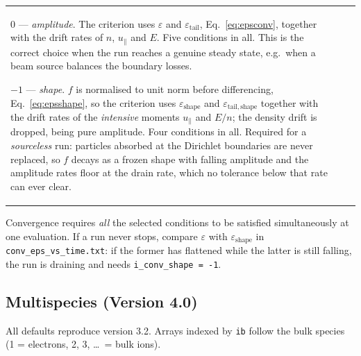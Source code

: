 \documentclass[11pt,a4paper]{article}
\begin{document}
\begin{longtable}{>{\ttfamily}p{3.2cm} p{1.5cm} p{9cm}}
  $0$ --- \emph{amplitude}.  The criterion uses $\varepsilon$ and
  $\varepsilon_\mathrm{tail}$, Eq.~\eqref{eq:epsconv}, together with the drift
  rates of $n$, $u_\parallel$ and $E$.  Five conditions in all.  This is the
  correct choice when the run reaches a genuine steady state, e.g.\ when a beam
  source balances the boundary losses.

  $-1$ --- \emph{shape}.  $f$ is normalised to unit norm before differencing,
  Eq.~\eqref{eq:epsshape}, so the criterion uses $\varepsilon_\mathrm{shape}$ and
  $\varepsilon_\mathrm{tail,shape}$ together with the drift rates of the
  \emph{intensive} moments $u_\parallel$ and $E/n$; the density drift is dropped,
  being pure amplitude.  Four conditions in all.  Required for a
  \emph{sourceless} run: particles absorbed at the Dirichlet boundaries are never
  replaced, so $f$ decays as a frozen shape with falling amplitude and the
  amplitude rates floor at the drain rate, which no tolerance below that rate can
  ever clear. \\[4pt]

\end{longtable}

Convergence requires \emph{all} the selected conditions to be satisfied
simultaneously at one evaluation.  If a run never stops, compare
$\varepsilon$ with $\varepsilon_\mathrm{shape}$ in
\texttt{conv\_eps\_vs\_time.txt}: if the former has flattened while the latter is
still falling, the run is draining and needs \texttt{i\_conv\_shape = -1}.


\subsection{Multispecies (Version 4.0)}
\label{sec:nml_ms}

All defaults reproduce version 3.2.  Arrays indexed by \texttt{ib} follow the bulk species
(1 = electrons, 2, 3, \dots\ = bulk ions).
\end{document}
